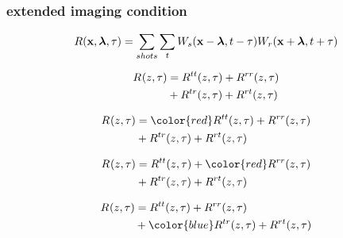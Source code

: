 










\begin{frame}\frametitle{extended imaging condition}
\[
R({\bf x},{\boldsymbol{\lambda}},\tau) =  \sum_{shots} \sum_t {W_s}({\bf x}-{\boldsymbol{\lambda}},t-\tau) {W_r}({\bf x}+{\boldsymbol{\lambda}},t+\tau)
\]
\end{frame}



\begin{frame}
\end{frame}






\begin{frame}
\begin{align}
\nonumber R^{}(z,\tau) &= { R^{tt}(z,\tau)} + {R^{rr}(z,\tau)}\\
\nonumber             &+ { R^{tr}(z,\tau) }+ { R^{rt}(z,\tau)}
\end{align}
\end{frame}


\begin{frame}
\begin{align}
\nonumber \Rct{} &= {\color{red} \Rct{tt}} + {\Rct{rr}}\\
\nonumber             &+ { \Rct{tr} }+ { \Rct{rt}}
\end{align}
\end{frame}


\begin{frame}
\begin{align}
\nonumber \Rct{} &= {\Rct{tt}} + {\color{red} \Rct{rr}}\\
\nonumber             &+ { \Rct{tr} }+ { \Rct{rt}}
\end{align}
\end{frame}


\begin{frame}
\begin{align}
\nonumber \Rct{} &= {\Rct{tt}} + {\Rct{rr}}\\
\nonumber             &+ {\color{blue}  \Rct{tr} }+ { \Rct{rt}}
\end{align}
\end{frame}


